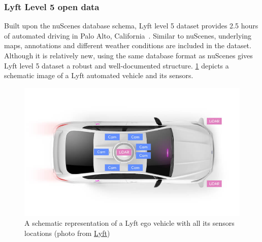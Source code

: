 \subsubsection{Lyft Level 5 open data}
Built upon the nuScenes database schema, Lyft level 5 dataset provides 2.5 hours of automated driving in Palo Alto, California~\cite{lyft2019}. Similar to nuScenes, underlying maps, annotations and different weather conditions are included in the dataset. Although it is relatively new, using the same database format as nuScenes gives Lyft level 5 dataset a robust and well-documented structure.  
\cref{fig:lyft} depicts a schematic image of a Lyft automated vehicle and its sensors.
\begin{figure}
    \centering
    \includegraphics[scale=0.5]{chapter_6/figures/lyft.jpg}
    \caption{A schematic representation of a Lyft ego vehicle with all its sensors locations (photo from \href{https://self-driving.lyft.com/level5}{Lyft})}
    \label{fig:lyft}
\end{figure}  
